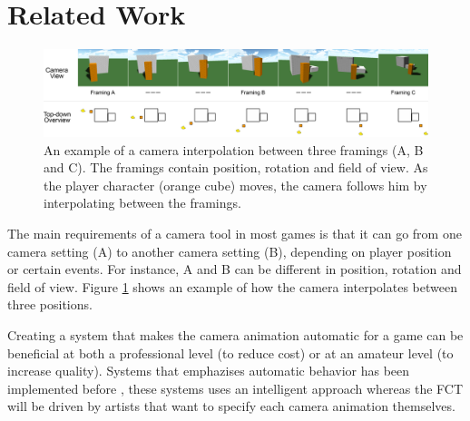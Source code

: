 \section{Related Work}\label{relatedWork}

\begin{figure}[htbp]
\centering
\includegraphics[width=1\textwidth]{Pics/InterpolationExample}
\caption{An example of a camera interpolation between three framings (A, B and C). The framings contain position, rotation and field of view. As the player character (orange cube) moves, the camera follows him by interpolating between the framings.}
\label{fig:InterpolationExample}
\end{figure}

The main requirements of a camera tool in most games is that it can go from one camera setting  (A) to another camera setting (B), depending on player position or certain events. For instance, A and B can be different in position, rotation and field of view.
Figure \ref{fig:InterpolationExample} shows an example of how the camera interpolates between three positions.

Creating a system that makes the camera animation automatic for a game can be beneficial at both a professional level (to reduce cost) or at an amateur level (to increase quality). Systems that emphazises automatic behavior has been implemented before \cite{bourne_constraintBased_2008, burelli_automatic_2014}, these systems uses an intelligent approach whereas the FCT will be driven by artists that want to specify each camera animation themselves.


